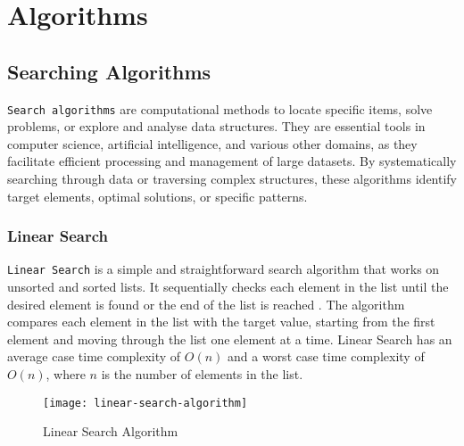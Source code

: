 


\section{Algorithms}



\subsection{Searching Algorithms}

\lstinline{Search algorithms} are computational methods to locate specific items, solve problems, or explore and analyse data structures. They are essential tools in computer science, artificial intelligence, and various other domains, as they facilitate efficient processing and management of large datasets. By systematically searching through data or traversing complex structures, these algorithms identify target elements, optimal solutions, or specific patterns.

\subsubsection{Linear Search}
\lstinline{Linear Search} is a simple and straightforward search algorithm that works on unsorted and sorted lists. It sequentially checks each element in the list until the desired element is found or the end of the list is reached \cite{shaalaa_linear_search}. The algorithm compares each element in the list with the target value, starting from the first element and moving through the list one element at a time. Linear Search has an average case time complexity of $O(n)$ and a worst case time complexity of $O(n)$, where $n$ is the number of elements in the list.

\begin{figure}[H]
    \centering
    \texttt{[image: linear-search-algorithm]}
    \caption{Linear Search Algorithm \cite{ravikiran_linear_search}}
    \label{fig:linear-search-algorithm}
\end{figure}

